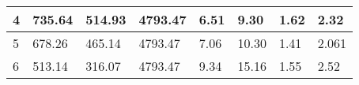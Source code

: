 \begin{table}
{\begin{tabular}{|l|l|l|l|l|l|l|l|}
4                                                               & 735.64                                                                                                  & 514.93                                                                                                    & 4793.47                                                                                                                  & 6.51                                                                                   & 9.30                                                                                    & 1.62                                                                           & 2.32                                                                            \\ \hline
5                                                               & 678.26                                                                                                  & 465.14                                                                                                   & 4793.47                                                                                                                  & 7.06                                                                                   & 10.30                                                                                   & 1.41                                                                           & 2.061                                                                            \\ \hline
6                                                               & 513.14                                                                                                  & 316.07                                                                                                    & 4793.47                                                                                                                  & 9.34                                                                                   & 15.16                                                                                   & 1.55                                                                          & 2.52                                                                            \\ \hline
\end{tabular}}
\end{table}

